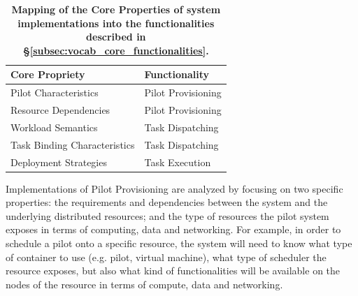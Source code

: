 \documentclass{sig-alternate}
\begin{document}

\begin{table}
\centering
 \begin{tabular}{|l|l|}
  \hline
    \textbf{Core Propriety} & \textbf{Functionality} \\ \hline
  \hline
    Pilot Characteristics & Pilot Provisioning \\
  \hline
    Resource Dependencies & Pilot Provisioning \\
  \hline
    Workload Semantics & Task Dispatching \\
  \hline
    Task Binding Characteristics & Task Dispatching \\
  \hline
    Deployment Strategies & Task Execution \\ \hline
 \end{tabular}
 \caption{\textbf{Mapping of the Core Properties of \pilotjob system
                  implementations into the functionalities described in
                  \S\ref{subsec:vocab_core_functionalities}.}\up}
 \label{table:core_properties}
\end{table}

Implementations of Pilot Provisioning are analyzed by focusing on two specific
properties: the requirements and dependencies between the \pilotjob system and
the underlying distributed resources; and the type of resources the pilot
system exposes in terms of computing, data and networking. For example, in
order to schedule a pilot onto a specific resource, the \pilotjob system will
need to know what type of container to use (e.g. pilot, virtual machine), what
type of scheduler the resource exposes, but also what kind of functionalities
will be available on the nodes of the resource in terms of compute, data and
networking.

\end{document}
